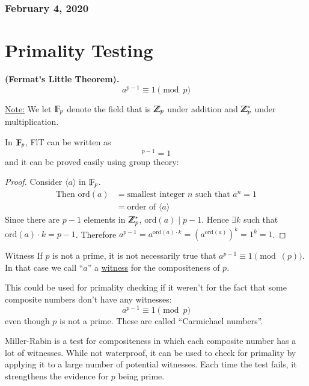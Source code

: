 \subsubsection*{February 4, 2020}
\section{Primality Testing}
\begin{theorem}\textbf{(Fermat's Little Theorem).}
	\begin{equation}
		a^{p-1}\equiv 1\pmod{p}
	\end{equation}
\end{theorem}

\ul{Note:} We let $\mathbb{F}_p$ denote the field that is $\mathbb{Z}_p$ under addition and $\mathbb{Z}_p^*$ under multiplication. 

In $\mathbb{F}_p$, FlT can be written as
\begin{equation}
	[a]^{p-1}=1
\end{equation}
and it can be proved easily using group theory: 

\begin{proof}
Consider $\langle a\rangle$ in $\mathbb{F}_p$. 
\begin{align*}
	\text{Then }\mathrm{ord}(a) &= \text{smallest integer $n$ such that $a^n=1$} \\
	&= \text{order of $\langle a\rangle$}
\end{align*}
Since there are $p-1$ elements in $\mathbb{Z}_p^*$, $\mathrm{ord}(a)\mid p-1$. Hence $\exists k$ such that $\mathrm{ord}(a)\cdot k=p-1$. Therefore $a^{p-1}=a^{\mathrm{ord}(a)\cdot k}=\left(a^{\mathrm{ord}(a)} \right)^k =1^k = 1$. 
\end{proof}

\begin{defn}{Witness}
	If $p$ is not a prime, it is not necessarily true that $a^{p-1}\equiv 1\pmod(p)$. In that case we call ``$a$'' a \ul{witness} for the compositeness of $p$. 
\end{defn}

This could be used for primality checking if it weren't for the fact that some composite numbers don't have any witnesses: 
\[a^{p-1}\equiv 1\pmod{p}\]
even though $p$ is not a prime. These are called ``Carmichael numbers''. 

Miller-Rabin is a test for compositeness in which each composite number has a lot of witnesses. While not waterproof, it can be used to check for primality by applying it to a large number of potential witnesses. Each time the test fails, it strengthens the evidence for $p$ being prime. 

